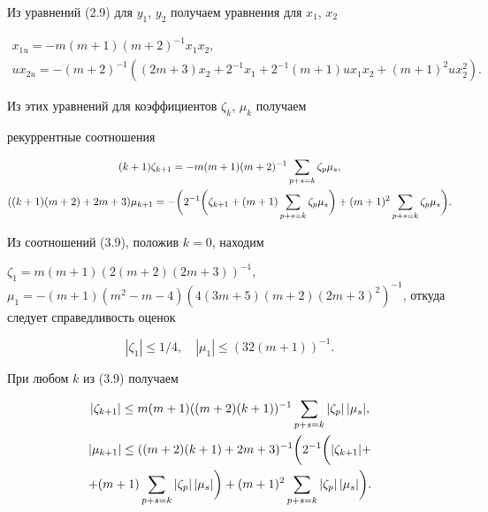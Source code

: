 Из уравнений (2.9) для $y_1$, $y_2$ получаем уравнения для $x_1$, $x_2$ 


\begin{gather*} 


x_{1u}=-m(m+1)(m+2)^{-1}x_1x_2,\\ 


u x_{2u}=-(m+2)^{-1}((2m+3)x_2+2^{-1}x_1+ 


2^{-1}(m+1)u x_1x_2+(m+1)^2u x^2_2). 


\end{gather*} 


Из этих уравнений для коэффициентов $\zeta_k$, $\mu_k$ получаем 


рекуррентные соотношения 


\begin{gather} 


(k+1)\zeta_{k+1}=-m(m+1)(m+2)^{-1}\sum_{p+s=k}\zeta_p\mu_s,\\ 


((k+1)(m+2)+2m+3)\mu_{k+1}=-\bigg(2^{-1}\bigg(\zeta_{k+1}+(m+1) 


\sum_{p+s=k}\zeta_p\mu_s\bigg)+(m+1)^2\sum_{p+s=k} 


\zeta_p\mu_s\bigg).\notag 


\end{gather} 


Из соотношений (3.9), положив $k=0$, находим 


$\zeta_1=m(m+1)(2(m+2)(2m+3))^{-1}$,\linebreak $\mu_1=-(m+1)(m^2-m-4)(4(3m+5)(m+2) 


(2m+3)^2)^{-1}$, откуда следует справедливость оценок 


\begin{equation} 


|\zeta_1|\le 1/4,\quad |\mu_1|\le(32(m+1))^{-1}. 


\end{equation} 


При любом $k$ из (3.9) получаем 


\begin{gather} 


|\zeta_{k+1}|\le m(m+1)((m+2)(k+1))^{-1}\sum_{p+s=k} 


|\zeta_p|\,|\mu_s|,\\ 


% 


|\mu_{k+1}|\le((m+2)(k+1)+2m+3)^{-1}\bigg(2^{-1}\bigg( 


|\zeta_{k+1}|+\notag\\


% 


+(m+1)\sum_{p+s=k}|\zeta_p|\,|\mu_s|\bigg)+(m+1)^2 


\sum_{p+s=k}|\zeta_p|\,|\mu_s|\bigg). \notag


\end{gather} 


